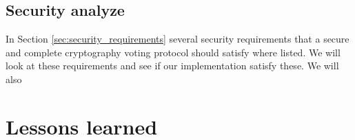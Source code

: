 \subsection{Security analyze}
In Section \ref{sec:security_requirements} several security requirements that a secure 
and complete cryptography voting protocol should satisfy where listed. We will look at
these requirements and see if our implementation satisfy these. We will also 

\section{Lessons learned}
